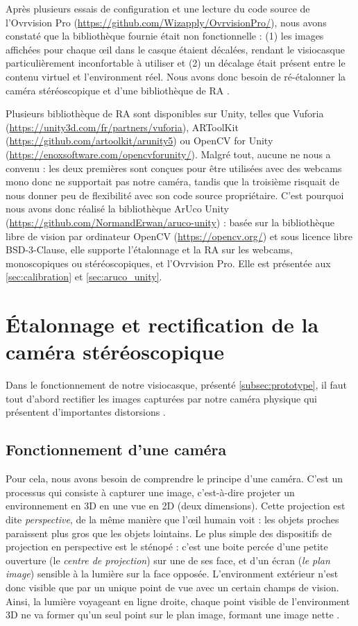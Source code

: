 Après plusieurs essais de configuration et une lecture du code source de l'Ovrvision Pro (\url{https://github.com/Wizapply/OvrvisionPro/}), nous avons constaté que la bibliothèque fournie était non fonctionnelle : (1) les images affichées pour chaque \oe il dans le casque étaient décalées, rendant le visiocasque particulièrement inconfortable à utiliser et (2) un décalage était présent entre le contenu virtuel et l'environment réel. Nous avons donc besoin de ré-étalonner la caméra stéréoscopique  et d'une bibliothèque de RA .

Plusieurs bibliothèque de RA sont disponibles sur Unity, telles que Vuforia (\url{https://unity3d.com/fr/partners/vuforia}), ARToolKit (\url{https://github.com/artoolkit/arunity5}) ou OpenCV for Unity (\url{https://enoxsoftware.com/opencvforunity/}). Malgré tout, aucune ne nous a convenu : les deux premières sont conçues pour être utilisées avec des webcams mono donc ne supportait pas notre caméra, tandis que la troisième risquait de nous donner peu de flexibilité avec son code source propriétaire. C'est pourquoi nous avons donc réalisé la bibliothèque ArUco Unity (\url{https://github.com/NormandErwan/aruco-unity}) : basée sur la bibliothèque libre de vision par ordinateur OpenCV (\url{https://opencv.org/}) et sous licence libre BSD-3-Clause, elle supporte l'étalonnage et la RA sur les webcams, monoscopiques ou stéréoscopiques, et l'Ovrvision Pro. Elle est présentée aux \autoref{sec:calibration} et \autoref{sec:aruco_unity}.


\section{Étalonnage et rectification de la caméra stéréoscopique}
\label{sec:calibration}

Dans le fonctionnement de notre visiocasque, présenté \autoref{subsec:prototype}, il faut tout d'abord rectifier les images capturées par notre caméra physique qui présentent d'importantes distorsions .

\subsection{Fonctionnement d'une caméra}
Pour cela, nous avons besoin de comprendre le principe d'une caméra. C'est un processus qui consiste à capturer une image, c'est-à-dire projeter un environnement en 3D en une vue en 2D (deux dimensions). Cette projection est dite \emph{perspective}, de la même manière que l'\oe il humain voit : les objets proches paraissent plus gros que les objets lointains. Le plus simple des dispositifs de projection en perspective est le sténopé : c'est une boite percée d'une petite ouverture (le \emph{centre de projection}) sur une de ses face, et d'un écran (\emph{le plan image}) sensible à la lumière sur la face opposée. L'environment extérieur n'est donc visible que par un unique point de vue avec un certain champs de vision. Ainsi, la lumière voyageant en ligne droite, chaque point visible de l'environment 3D ne va former qu'un seul point sur le plan image, formant une image nette .

